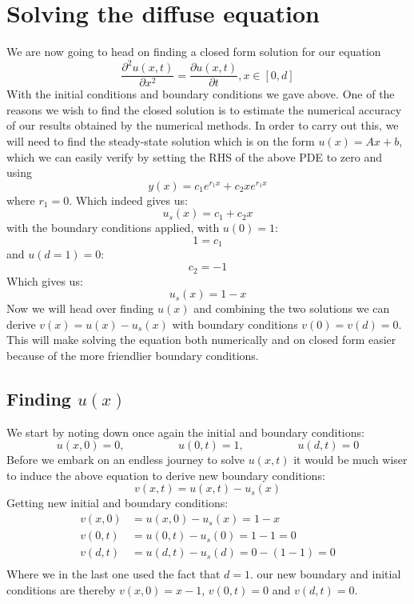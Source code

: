 \documentclass{article}
\newcommand{\beq}{\begin{equation}}
\newcommand{\eeq}{\end{equation}}
\begin{document}
\section{Solving the diffuse equation}
We are now going to head on finding a closed form solution for our equation
$$\frac{\partial^2 u(x,t)}{\partial x^2} = \frac{\partial u(x,t)}{\partial t}, x \in [0,d]$$
With the initial conditions and boundary conditions we gave above. One of the reasons we wish to find the closed solution is to estimate the numerical accuracy of our results obtained by the numerical methods. 
In order to carry out this, we will need to find the steady-state solution which is on the form $u(x) = Ax + b$, which 
we can easily verify by setting the RHS of the above PDE to zero and using $$y(x) = c_1e^{r_1x} + c_2xe^{r_1x}$$ where $r_1 = 0$. 
Which indeed gives us: $$u_s(x) = c_1 + c_2x$$
with the boundary conditions applied, with $u(0) = 1$:
$$1 = c_1$$
and $u(d=1) = 0$:
$$c_2 = -1$$
Which gives us: $$u_s(x) = 1 - x$$
Now we will head over finding $u(x)$ and combining the two solutions we can derive $v(x) = u(x) - u_s(x)$ with boundary conditions
$v(0) = v(d) = 0$. This will make solving the equation both numerically and on closed form easier because of the more friendlier boundary conditions.
\subsection{Finding $u(x)$}
We start by noting down once again the initial and boundary conditions:
\beq
u(x,0) = 0, \hspace{2cm} u(0,t) = 1, \hspace{2cm} u(d,t) = 0 \nonumber
\eeq
Before we embark on an endless journey to solve $u(x,t)$ it would be much wiser to induce the above equation to derive new boundary conditions:
$$v(x,t) = u(x,t) - u_s(x)$$
Getting new initial and boundary conditions:
\begin{align*}
v(x,0) &= u(x,0) - u_s(x) = 1 - x\\
v(0,t) &= u(0,t) - u_s(0) = 1 - 1 = 0\\
v(d,t) &= u(d,t) - u_s(d) = 0 - (1-1) = 0\\
\end{align*} 
Where we in the last one used the fact that $d=1$. 
our new boundary and initial conditions are thereby $v(x,0) = x-1$, $v(0,t) = 0$ and $v(d,t) = 0$.
\end{document}
